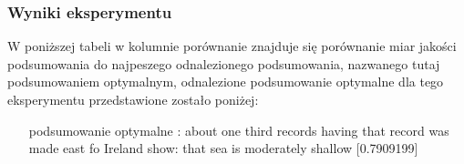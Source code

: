 \documentclass{article}
\begin{document}
\subsubsection{Wyniki eksperymentu}

W poniższej tabeli w kolumnie porównanie znajduje się porównanie miar jakości podsumowania do najpeszego odnalezionego podsumowania, nazwanego tutaj podsumowaniem optymalnym, odnalezione podsumowanie optymalne dla tego eksperymentu przedstawione zostało poniżej:

\begin{itemize}
    \item[podsumowanie optymalne]: about one third records having that record was made east fo Ireland show: that sea is moderately shallow  [0.7909199]
\end{itemize}
\end{document}
